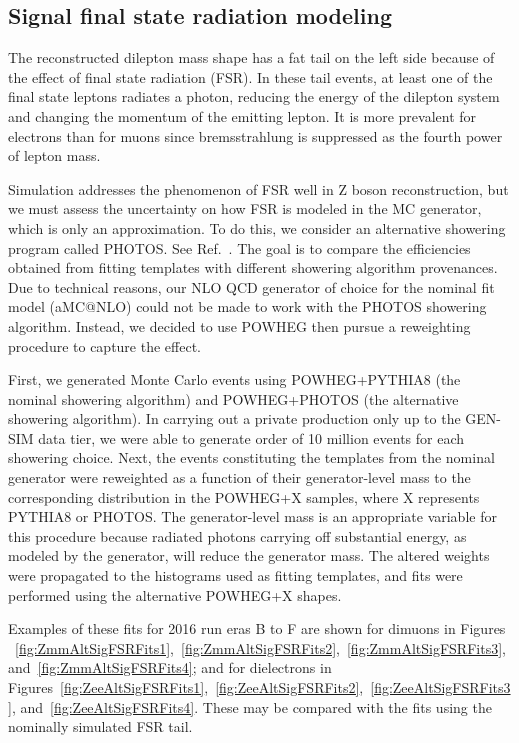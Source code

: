 {\clearpage
\subsection{Signal final state radiation modeling}
The reconstructed dilepton mass shape has a fat tail on the left side because of the effect of final state radiation (FSR).
In these tail events, at least one of the final state leptons radiates a photon,
reducing the energy of the dilepton system and changing the momentum of the emitting lepton.
It is more prevalent for electrons than for muons since bremsstrahlung is suppressed as the fourth power of lepton mass.

Simulation addresses the phenomenon of FSR well in Z boson reconstruction, but we must assess the uncertainty on
how FSR is modeled in the MC generator, which is only an approximation.
To do this, we consider an alternative showering program called PHOTOS. See Ref.~\cite{Golonka:2005pn}.
The goal is to compare the efficiencies obtained from fitting templates with different showering algorithm provenances.
Due to technical reasons, our NLO QCD generator of choice for the nominal fit model (aMC@NLO) could not be made to work with the PHOTOS showering algorithm.
Instead, we decided to use POWHEG then pursue a reweighting procedure to capture the effect.

First, we generated Monte Carlo events using POWHEG+PYTHIA8 (the nominal showering algorithm) and POWHEG+PHOTOS (the alternative showering algorithm).
In carrying out a private production only up to the GEN-SIM data tier, we were able to generate order of 10 million events for each showering choice.
Next, the events constituting the templates from the nominal generator were reweighted as a function of their generator-level mass 
to the corresponding distribution in the POWHEG+X samples, where X represents PYTHIA8 or PHOTOS. 
The generator-level mass is an appropriate variable for this procedure because radiated photons carrying off substantial energy, as modeled by the generator, will reduce the generator mass.
The altered weights were propagated to the histograms used as fitting templates, and fits were performed using the alternative POWHEG+X shapes.

Examples of these fits for 2016 run eras B to F are shown for dimuons in
Figures ~\ref{fig:ZmmAltSigFSRFits1},~\ref{fig:ZmmAltSigFSRFits2},~\ref{fig:ZmmAltSigFSRFits3}, and~\ref{fig:ZmmAltSigFSRFits4};
and for dielectrons in Figures~\ref{fig:ZeeAltSigFSRFits1},~\ref{fig:ZeeAltSigFSRFits2},~\ref{fig:ZeeAltSigFSRFits3}, and~\ref{fig:ZeeAltSigFSRFits4}.
These may be compared with the fits using the nominally simulated FSR tail.

}
